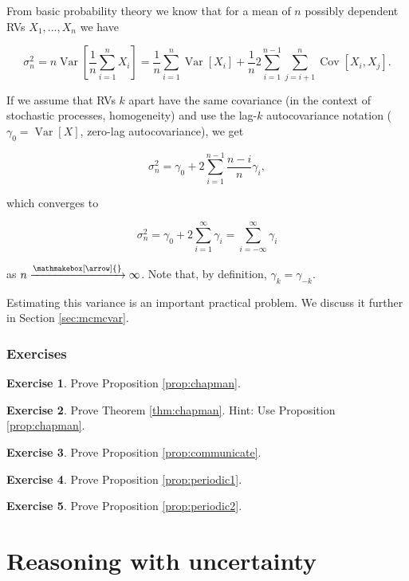 \documentclass{book}
\theoremstyle{plain}%
\theoremstyle{definition}
\newtheorem{exercise}{Exercise}[chapter]
\DeclareMathOperator{\Var}{Var}
\DeclareMathOperator{\Cov}{Cov}
\newlength{\arrow}
\newcommand*{\myrightarrow}[1]{\xrightarrow{\mathmakebox[\arrow]{#1}}}
\begin{document}
From basic probability theory we know that for a mean of $n$ possibly dependent RVs $X_1,...,X_n$ we have

$$\sigma_n^2 = n\Var[\frac{1}{n}\sum_{i=1}^n X_i] = \frac{1}{n} \sum_{i=1}^n \Var[X_i] + \frac{1}{n} 2\sum_{i=1}^{n-1} \sum_{j=i+1}^n \Cov[X_i, X_j].$$

If we assume that RVs $k$ apart have the same covariance (in the context of stochastic processes, homogeneity) and use the lag-$k$ autocovariance notation ($\gamma_0 = \Var[X]$, zero-lag autocovariance), we get

$$\sigma_n^2 = \gamma_0 + 2\sum_{i=1}^{n-1} \frac{n - i}{n} \gamma_i,$$

which converges to

$$\sigma_n^2 = \gamma_0 + 2\sum_{i=1}^{\infty} \gamma_i = \sum_{i=-\infty}^{\infty} \gamma_i$$

as $n \myrightarrow{} \infty$. Note that, by definition, $\gamma_k = \gamma_{-k}$.

Estimating this variance is an important practical problem. We discuss it further in Section \ref{sec:mcmcvar}.

\section*{Exercises}

\begin{exercise}
Prove Proposition \ref{prop:chapman}.
\end{exercise}

\begin{exercise}
Prove Theorem \ref{thm:chapman}. Hint: Use Proposition \ref{prop:chapman}.
\end{exercise}

\begin{exercise}
Prove Proposition \ref{prop:communicate}.
\end{exercise}

\begin{exercise}
Prove Proposition \ref{prop:periodic1}.
\end{exercise}

\begin{exercise}
Prove Proposition \ref{prop:periodic2}.
\end{exercise}



\part{Reasoning with uncertainty}
\end{document}
